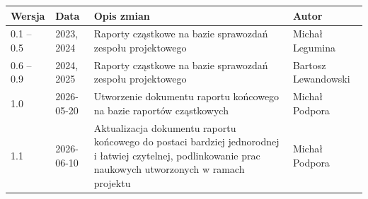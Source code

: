 \documentclass[12pt,a4paper]{report}
\begin{document}
\begin{center}
\renewcommand{\arraystretch}{1.4}
\begin{tabular}{|p{1.7cm}|p{2.0cm}|p{6.2cm}|p{4.1cm}|}
    \hline
    \textbf{Wersja} & \textbf{Data} & \textbf{Opis zmian} & \textbf{Autor} \\
    \hline
    0.1 -- 0.5 & 2023, 2024 & Raporty cząstkowe na bazie sprawozdań zespołu projektowego & Michał Legumina \\
    \hline
    0.6 -- 0.9 & 2024, 2025 & Raporty cząstkowe na bazie sprawozdań zespołu projektowego  & Bartosz Lewandowski \\
    \hline
    1.0 & 2026-05-20 & Utworzenie dokumentu raportu końcowego na bazie raportów cząstkowych & Michał Podpora \\
    \hline
    1.1 & 2026-06-10 & Aktualizacja dokumentu raportu końcowego do postaci bardziej jednorodnej i łatwiej czytelnej, podlinkowanie prac naukowych utworzonych w ramach projektu & Michał Podpora \\
    \hline
\end{tabular}
\end{center}
\end{document}
